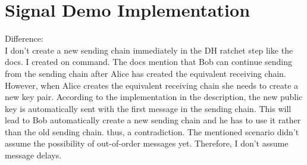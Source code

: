 \chapter{Signal Demo Implementation}
\label{ch:implementation}

Difference:\\
I don't create a new sending chain immediately in the DH ratchet step like the docs. I created on command. The docs mention that Bob can continue sending from the sending chain after Alice has created the equivalent receiving chain. However, when Alice creates the equivalent receiving chain she needs to create a new key pair. According to the implementation in the description, the new public key is automatically sent with the first message in the sending chain. This will lead to Bob automatically create a new sending chain and he has to use it rather than the old sending chain. thus, a contradiction. The mentioned scenario didn't assume the possibility of out-of-order messages yet. Therefore, I don't assume message delays.
